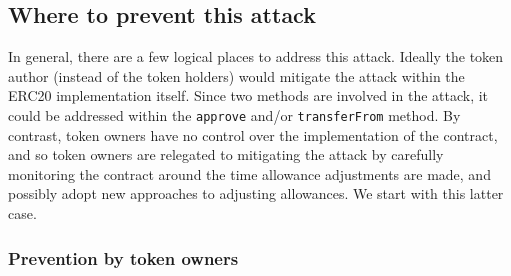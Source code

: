 \subsection{Where to prevent this attack}

In general, there are a few logical places to address this attack. Ideally the token author (instead of the token holders) would mitigate the attack within the ERC20 implementation itself. Since two methods are involved in the attack, it could be addressed within the \texttt{approve} and/or \texttt{transferFrom} method. By contrast, token owners have no control over the implementation of the contract, and so token owners are relegated to mitigating the attack by carefully monitoring the contract around the time allowance adjustments are made, and possibly adopt new approaches to adjusting allowances. We start with this latter case.


\subsubsection*{Prevention by token owners}


